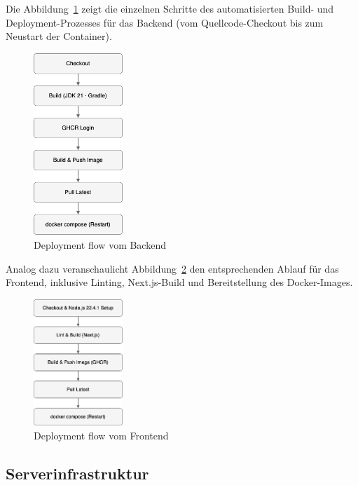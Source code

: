 \documentclass[12pt,a4paper]{report}
\begin{document}
        Die Abbildung~\ref{fig:backend-flow} zeigt die einzelnen Schritte des automatisierten Build- und Deployment-Prozesses für das Backend
        (vom Quellcode-Checkout bis zum Neustart der Container).

        \begin{figure}[H]
          \centering
          \includegraphics[width=0.3\textwidth]{../figures/backend-flow.drawio.png}
          \caption{Deployment flow vom Backend}
          \label{fig:backend-flow}
        \end{figure}


        Analog dazu veranschaulicht Abbildung~\ref{fig:frontend-flow} den entsprechenden Ablauf für das Frontend,
        inklusive Linting, Next.js-Build und Bereitstellung des Docker-Images.

        \begin{figure}[H]
          \centering
          \includegraphics[width=0.3\textwidth]{../figures/frontend-flow.drawio.png}
          \caption{Deployment flow vom Frontend}
          \label{fig:frontend-flow}
        \end{figure}

    \subsection{Serverinfrastruktur}
\end{document}
